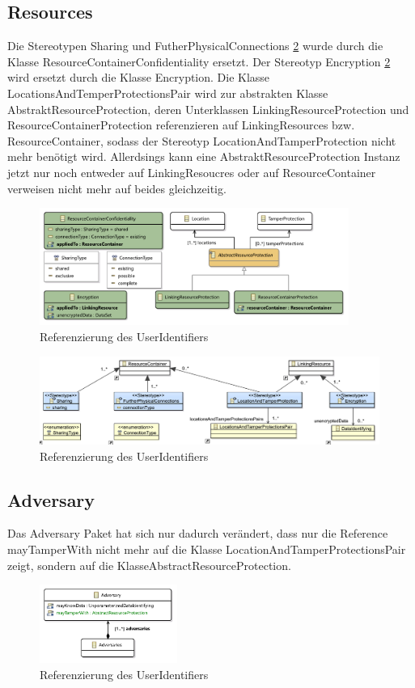 \documentclass[twoside, ngerman]{sdqseminar}
\begin{document}
\subsection{Resources}
Die Stereotypen Sharing und FutherPhysicalConnections \ref{resoucresProfil} wurde durch die Klasse ResourceContainerConfidentiality ersetzt. Der Stereotyp Encryption \ref{resoucresProfil} wird ersetzt durch die Klasse Encryption. Die Klasse LocationsAndTemperProtectionsPair wird zur abstrakten Klasse AbstraktResourceProtection, deren Unterklassen LinkingResourceProtection und ResourceContainerProtection referenzieren auf LinkingResources bzw. ResourceContainer, sodass der Stereotyp LocationAndTamperProtection nicht mehr benötigt wird. Allerdsings kann eine AbstraktResourceProtection Instanz jetzt nur noch entweder auf LinkingResoucres oder auf ResourceContainer verweisen nicht mehr auf beides gleichzeitig.
\begin{figure}[htbp]
	\label{resoucresPackage}
	\centering
	\includegraphics[width=0.9\textwidth]{images/new/resources.pdf}
	\caption{Referenzierung des UserIdentifiers}
\end{figure}
\begin{figure}[htbp]
	\label{resoucresProfil}
	\centering
	\includegraphics[width=0.99\textwidth]{images/old/resourceProfile.pdf}
	\caption{Referenzierung des UserIdentifiers}
\end{figure}

\subsection{Adversary}
Das Adversary Paket hat sich nur dadurch verändert, dass nur die Reference mayTamperWith nicht mehr auf die Klasse LocationAndTamperProtectionsPair zeigt, sondern auf die KlasseAbstractResourceProtection.
\begin{figure}[htbp]
	\label{adversaryPackage}
	\centering
	\includegraphics[width=0.4\textwidth]{images/new/adversary.pdf}
	\caption{Referenzierung des UserIdentifiers}
\end{figure}
\end{document}
